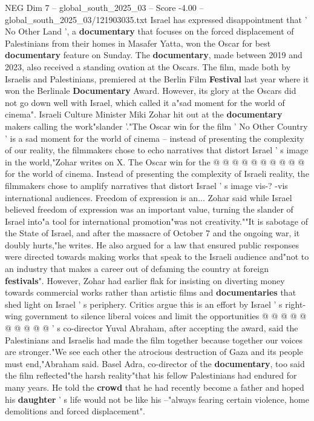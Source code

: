 \begin{textsample}{NEG Dim 7 – global\_south\_2025\_03 – Score -4.00 – global\_south\_2025\_03/121903035.txt}  \label{ex:f7_neg_356}
Israel has expressed disappointment that ' No Other Land ', a \textbf{documentary} that focuses on the forced displacement of Palestinians from their homes in Masafer Yatta, won the Oscar for best \textbf{documentary} feature on Sunday.
The \textbf{documentary}, made between 2019 and 2023, also received a standing ovation at the Oscars.
The film, made both by Israelis and Palestinians, premiered at the Berlin Film \textbf{Festival} last year where it won the Berlinale \textbf{Documentary} Award.
However, its glory at the Oscars did not go down well with Israel, which called it a"sad moment for the world of cinema".
Israeli Culture Minister Miki Zohar hit out at the \textbf{documentary} makers calling the work"slander '."The Oscar win for the film ' No Other Country ' is a sad moment for the world of cinema -- instead of presenting the complexity of our reality, the filmmakers chose to echo narratives that distort Israel ' s image in the world,"Zohar writes on X.
The Oscar win for the @ @ @ @ @ @ @ @ @ @ for the world of cinema.
Instead of presenting the complexity of Israeli reality, the filmmakers chose to amplify narratives that distort Israel ' s image vis-? -vis international audiences.
Freedom of expression is an...
Zohar said while Israel believed freedom of expression was an important value, turning the slander of Israel into"a tool for international promotion"was not creativity.""It is sabotage of the State of Israel, and after the massacre of October 7 and the ongoing war, it doubly hurts,"he writes.
He also argued for a law that ensured public responses were directed towards making works that speak to the Israeli audience and"not to an industry that makes a career out of defaming the country at foreign \textbf{festivals}".
However, Zohar had earlier flak for insisting on diverting money towards commercial works rather than artistic films and \textbf{documentaries} that shed light on Israel ' s periphery.
Critics argue this is an effort by Israel ' s right-wing government to silence liberal voices and limit the opportunities @ @ @ @ @ @ @ @ @ @ ' s co-director Yuval Abraham, after accepting the award, said the Palestinians and Israelis had made the film together because together our voices are stronger."We see each other the atrocious destruction of Gaza and its people must end,"Abraham said.
Basel Adra, co-director of the \textbf{documentary}, too said the film reflected"the harsh reality"that his fellow Palestinians had endured for many years.
He told the \textbf{crowd} that he had recently become a father and hoped his \textbf{daughter} ' s life would not be like his --"always fearing certain violence, home demolitions and forced displacement".

\end{textsample}
